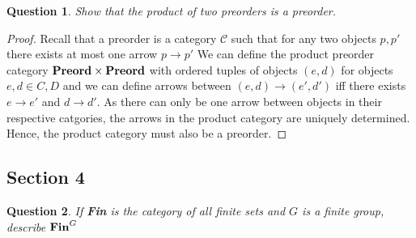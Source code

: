 \documentclass[12pt]{article}
\newtheorem{question}{Question}[section]
\theoremstyle{remark}
\begin{document}
\begin{figure}[!h]
\centering
\end{figure}




\begin{question}
Show that the product of two preorders is a preorder.
\end{question}

\begin{proof}
 Recall that a preorder is a category $\mathcal{C}$ such that for any two objects $p,p'$ there exists at most one arrow $p \rightarrow p'$
 We can define the product preorder category ${\bf Preord} \times {\bf Preord}$ with ordered tuples of objects $(e,d)$ for objects $e,d \in C,D$
 and we can define arrows between $(e,d) \rightarrow (e',d')$ iff there exists $e \rightarrow e'$ and $d \rightarrow d'$. As there can only be one arrow between objects in their
 respective catgories, the arrows in the product category are uniquely determined. Hence, the product category must also be a preorder.
\end{proof}

\subsection{Section 4}

\begin{question}
 If {\bf Fin} is the category of all finite sets and $G$ is a finite group, describe ${\bf Fin}^G$
\end{question}
\end{document}
